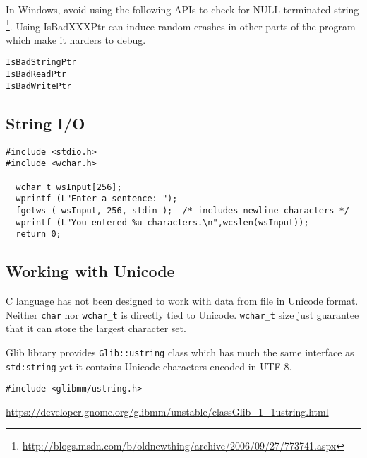 \begin{mdframed}
In Windows, avoid using the following APIs to check for NULL-terminated string
\footnote{\url{http://blogs.msdn.com/b/oldnewthing/archive/2006/09/27/773741.aspx}}.
Using IsBadXXXPtr can induce random crashes in other parts of the program which
make it harders to debug.

\begin{verbatim}
IsBadStringPtr
IsBadReadPtr
IsBadWritePtr
\end{verbatim}
\end{mdframed}

\subsection{String I/O}

\begin{Verbatim}
#include <stdio.h>
#include <wchar.h>

  wchar_t wsInput[256];
  wprintf (L"Enter a sentence: ");
  fgetws ( wsInput, 256, stdin );  /* includes newline characters */
  wprintf (L"You entered %u characters.\n",wcslen(wsInput));
  return 0;
\end{Verbatim}


\subsection{Working with Unicode}
\label{sec:string_Unicode}

C language has not been designed to work with data from file in Unicode format.
Neither \verb!char! nor \verb!wchar_t! is directly tied to Unicode.
\verb!wchar_t! size just guarantee that it can store the largest character set.


Glib library provides \verb!Glib::ustring! class which has much the same
interface as \verb!std:string! yet it contains Unicode characters encoded in UTF-8.
\begin{verbatim}
#include <glibmm/ustring.h>
\end{verbatim}
\url{https://developer.gnome.org/glibmm/unstable/classGlib_1_1ustring.html}

